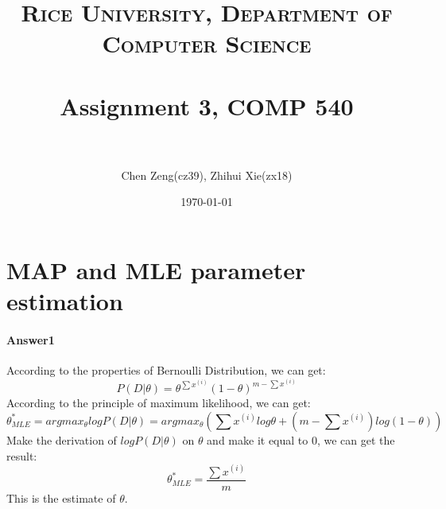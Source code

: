 \documentclass[paper=a4, fontsize=11pt]{scrartcl} %
\title{	
\normalfont \normalsize
\textsc{Rice University, Department of Computer Science} \\ [25pt] %
\horrule{0.5pt} \\[0.4cm] %
\huge Assignment 3, COMP 540 \\ %
\horrule{2pt} \\[0.5cm] %
}
\author{Chen Zeng(cz39), Zhihui Xie(zx18)} %
\date{\normalsize\today} %
\numberwithin{equation}{section} %
\numberwithin{figure}{section} %
\numberwithin{table}{section} %
\begin{document}
\maketitle %


\section{MAP and MLE parameter estimation}

\paragraph{\textbf{Answer1}}
According to the properties of Bernoulli Distribution, we can get:
\begin{equation*}
P\left ( D | \theta  \right )=\theta ^{\sum x^{\left ( i \right )}}\left ( 1-\theta  \right )^{m-\sum x^{\left ( i \right )}}
\end{equation*}
According to the principle of maximum likelihood, we can get:
\begin{equation*}
\theta _{MLE}^{\ast}=argmax_{\theta }logP\left ( D|\theta  \right )=argmax_{\theta }\left ( \sum x^{\left ( i \right )}log\theta +\left ( m-\sum x^{\left ( i \right )} \right )log\left ( 1-\theta  \right ) \right )
\end{equation*}
Make the derivation of $logP\left ( D|\theta  \right )$ on $\theta$ and make it equal to 0, we can get the result:
\begin{equation*}
\theta _{MLE}^{\ast} =\frac{\sum x^{\left ( i \right )}}{m}
\end{equation*}
This is the estimate of $\theta$.
\end{document}
